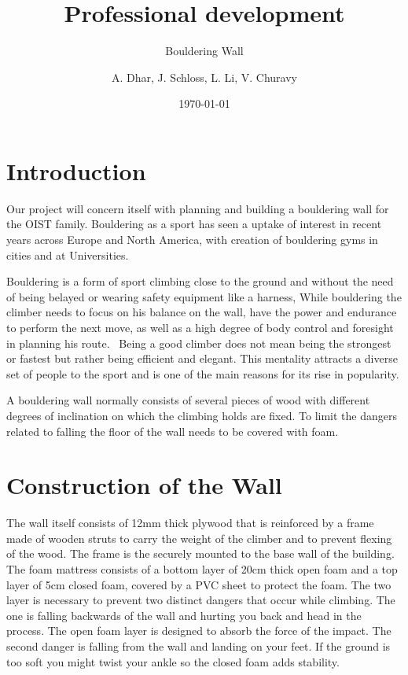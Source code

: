 \documentclass{scrartcl}
\date{\today}
\title{Professional development}
\subtitle{Bouldering Wall}
\author{A. Dhar, J. Schloss, L. Li, V. Churavy}
\begin{document}
\maketitle
\section{Introduction}
Our project will concern itself with planning and building a bouldering wall for the OIST family.
Bouldering as a sport has seen a uptake of interest in recent years across Europe and North America, with creation of bouldering gyms in cities and at Universities. 

Bouldering is a form of sport climbing close to the ground and without the need of being belayed or wearing safety equipment like a harness, While bouldering the climber needs to focus on his balance on the wall, have the power and endurance to perform the next move, as well as a high degree of body control and foresight in planning his route.  Being a good climber does not mean being the strongest or fastest but rather being efficient and elegant. This mentality attracts a diverse set of people to the sport and is one of the main reasons for its rise in popularity.

A bouldering wall normally consists of several pieces of wood with different degrees of inclination on which the climbing holds are fixed. To limit the dangers related to falling the floor of the wall needs to be covered with foam.

\section{Construction of the Wall}
The wall itself consists of 12mm thick plywood that is reinforced by a frame made of wooden struts to carry the weight of the climber and to prevent flexing of the wood. The frame is the securely mounted to the base wall of the building. 
The foam mattress consists of a bottom layer of 20cm thick open foam and a top layer of 5cm closed foam, covered by a PVC sheet to protect the foam.
The two layer is necessary to prevent two distinct dangers that occur while climbing. The one is falling backwards of the wall and hurting you back and head in the process. The open foam layer is designed to absorb the force of the impact. The second danger is falling from the wall and landing on your feet. If the ground is too soft you might twist your ankle so the closed foam adds stability.
\end{document}
